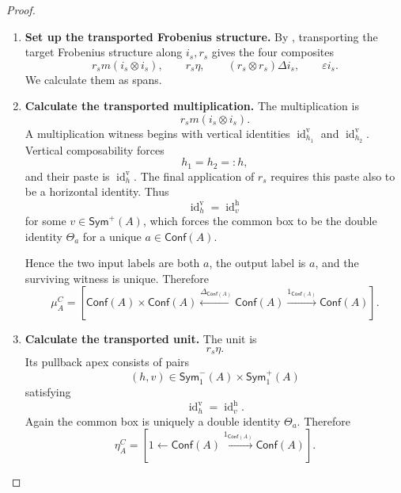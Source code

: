 \documentclass[oneside]{article}
\newcommand{\Conf}{\mathsf{Conf}}
\newcommand{\Sym}{\mathsf{Sym}}
\newcommand{\id}{\operatorname{id}}
\theoremstyle{plain}
\theoremstyle{definition}
\theoremstyle{remark}
\begin{document}
\begin{proof}
    \leavevmode
    \begin{enumerate}[beginpenalty=10000]
        \item \textbf{Set up the transported Frobenius structure.}
        By \cite[Proposition~1.4]{PastroStreet2009}, transporting the target Frobenius structure along \(i_s,r_s\) gives the four composites
        \[
            r_sm(i_s\otimes i_s),
            \qquad
            r_s\eta,
            \qquad
            (r_s\otimes r_s)\Delta i_s,
            \qquad
            \varepsilon i_s.
        \]
        We calculate them as spans.

        \item \textbf{Calculate the transported multiplication.} The multiplication is
        \[
            r_sm(i_s\otimes i_s).
        \]
        A multiplication witness begins with vertical identities \(\id_{h_1}^{\mathrm v}\) and \(\id_{h_2}^{\mathrm v}\). Vertical composability forces
        \[
            h_1=h_2=:h,
        \]
        and their paste is \(\id_h^{\mathrm v}\). The final application of \(r_s\) requires this paste also to be a horizontal identity. Thus
        \[
            \id_h^{\mathrm v}
            =
            \id_v^{\mathrm h}
        \]
        for some \(v\in\Sym^+(A)\), which forces the common box to be the double identity \(\Theta_a\) for a unique \(a\in\Conf(A)\).

        Hence the two input labels are both \(a\), the output label is \(a\), and the surviving witness is unique. Therefore
        \[
            \mu_A^C
            =
            \left[
                \Conf(A)\times\Conf(A)
                \xleftarrow{\Delta_{\Conf(A)}}
                \Conf(A)
                \xrightarrow{1_{\Conf(A)}}
                \Conf(A)
            \right].
        \]

        \item \textbf{Calculate the transported unit.} The unit is
        \[
            r_s\eta.
        \]
        Its pullback apex consists of pairs
        \[
            (h,v)
            \in
            \Sym^-_1(A)\times\Sym^+_1(A)
        \]
        satisfying
        \[
            \id_h^{\mathrm v}
            =
            \id_v^{\mathrm h}.
        \]
        Again the common box is uniquely a double identity \(\Theta_a\). Therefore
        \[
            \eta_A^C
            =
            \left[
                1
                \xleftarrow{}
                \Conf(A)
                \xrightarrow{1_{\Conf(A)}}
                \Conf(A)
            \right].
        \]


\end{enumerate}
\end{proof}
\end{document}
